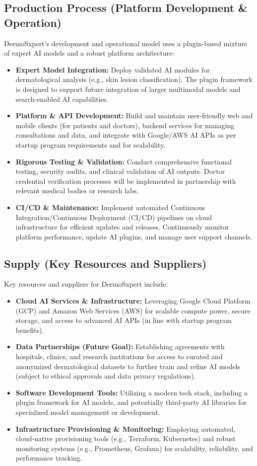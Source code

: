\subsection{Production Process (Platform Development \& Operation)}
DermoSxpert’s development and operational model uses a plugin‐based mixture of expert AI models and a robust platform architecture:
\begin{itemize}
  \item \textbf{Expert Model Integration:} Deploy validated AI modules for dermatological analysis (e.g., skin lesion classification). The plugin framework is designed to support future integration of larger multimodal models and search‐enabled AI capabilities.
  \item \textbf{Platform \& API Development:} Build and maintain user-friendly web and mobile clients (for patients and doctors), backend services for managing consultations and data, and integrate with Google/AWS AI APIs as per startup program requirements and for scalability.
  \item \textbf{Rigorous Testing \& Validation:} Conduct comprehensive functional testing, security audits, and clinical validation of AI outputs. Doctor credential verification processes will be implemented in partnership with relevant medical bodies or research labs.
  \item \textbf{CI/CD \& Maintenance:} Implement automated Continuous Integration/Continuous Deployment (CI/CD) pipelines on cloud infrastructure for efficient updates and releases. Continuously monitor platform performance, update AI plugins, and manage user support channels.
\end{itemize}

\subsection{Supply (Key Resources and Suppliers)}
Key resources and suppliers for DermoSxpert include:
\begin{itemize}
  \item \textbf{Cloud AI Services \& Infrastructure:} Leveraging Google Cloud Platform (GCP) and Amazon Web Services (AWS) for scalable compute power, secure storage, and access to advanced AI APIs (in line with startup program benefits).
  \item \textbf{Data Partnerships (Future Goal):} Establishing agreements with hospitals, clinics, and research institutions for access to curated and anonymized dermatological datasets to further train and refine AI models (subject to ethical approvals and data privacy regulations).
  \item \textbf{Software Development Tools:} Utilizing a modern tech stack, including a plugin framework for AI models, and potentially third‐party AI libraries for specialized model management or development.
  \item \textbf{Infrastructure Provisioning \& Monitoring:} Employing automated, cloud‐native provisioning tools (e.g., Terraform, Kubernetes) and robust monitoring systems (e.g., Prometheus, Grafana) for scalability, reliability, and performance tracking.
\end{itemize}

